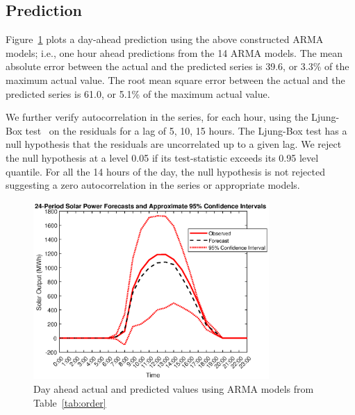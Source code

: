 \documentclass[review]{elsarticle}
\begin{document}
\begin{table}[!htb]
\centering
\caption{Estimated $p$ and $q$ values for ARMA($p,q$) models for 14 hours of 
the day.}
\label{tab:order}
\end{table}

\subsection{Prediction}

Figure~\ref{fig:prediction} plots a day-ahead prediction using the above 
constructed ARMA models; i.e., one hour ahead predictions from the 14 ARMA 
models. The mean absolute error between the actual and the predicted series is 
39.6, or  3.3\% of the maximum actual value. The root mean square 
error between the actual and the predicted series is 
61.0, or  5.1\% of the maximum actual value. 

We further verify autocorrelation in the series, for each hour, using the 
Ljung-Box test~\cite{ljung1978measure} on the residuals for a lag of 5, 10, 15 
hours. The Ljung-Box  test has a 
null hypothesis that the residuals are uncorrelated up to a 
given lag. We reject the null hypothesis at a level 0.05 if its test-statistic 
exceeds its 
0.95 level quantile. For all the 14 hours of the day, the null hypothesis is not
rejected suggesting a zero autocorrelation in the series or appropriate 
models. 


\begin{figure}[!t]
\centering
\includegraphics[width=0.8\textwidth]{prediction.eps}
\caption{Day ahead actual and predicted values using ARMA models from 
Table~\ref{tab:order}}
 \label{fig:prediction}
\end{figure}
\end{document}
